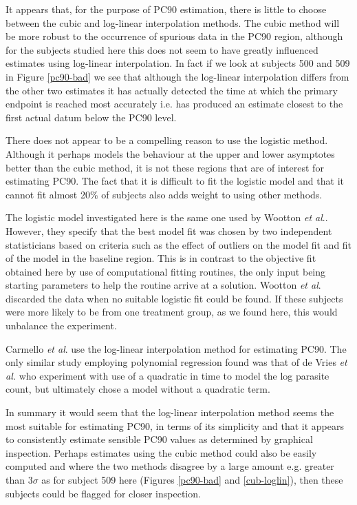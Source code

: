 It appears that, for the purpose of PC90 estimation, there is little to choose between the cubic and log-linear interpolation methods. The cubic method will be more robust to the occurrence of spurious data in the PC90 region, although for the subjects studied here this does not seem to have greatly influenced estimates using log-linear interpolation. In fact if we look at subjects 500 and 509 in Figure \ref{pc90-bad} we see that although the log-linear interpolation differs from the other two estimates it has actually detected the time at which the primary endpoint is reached most accurately i.e. has produced an estimate closest to the first actual datum below the PC90 level.

There does not appear to be a compelling reason to use the logistic method. Although it perhaps models the behaviour at the upper and lower asymptotes better than the cubic method, it is not these regions that are of interest for estimating PC90. The fact that it is difficult to fit the logistic model and that it cannot fit almost 20\% of subjects also adds weight to using other methods.

The logistic model investigated here is the same one used by Wootton \textit{et al}.\cite{wootton}. However, they specify that the best model fit was chosen by two independent statisticians based on criteria such as the effect of outliers on the model fit and fit of the model in the baseline region. This is in contrast to the objective fit obtained here by use of computational fitting routines, the only input being starting parameters to help the routine arrive at a solution. Wootton \textit{et al}. discarded the data when no suitable logistic fit could be found. If these subjects were more likely to be from one treatment group, as we found here, this would unbalance the experiment.

Carmello \textit{et al}.\cite{carmello} use the log-linear interpolation method for estimating PC90. The only similar study employing polynomial regression found was that of de Vries \textit{et al.}\cite{vries} who experiment with use of a quadratic in time to model the log parasite count, but ultimately chose a model without a quadratic term.

In summary it would seem that the log-linear interpolation method seems the most suitable for estimating PC90, in terms of its simplicity and that it appears to consistently estimate sensible PC90 values as determined by graphical inspection. Perhaps estimates using the cubic method could also be easily computed and where the two methods disagree by a large amount e.g. greater than $3\sigma$ as for subject 509 here (Figures \ref{pc90-bad} and \ref{cub-loglin}), then these subjects could be flagged for closer inspection.


